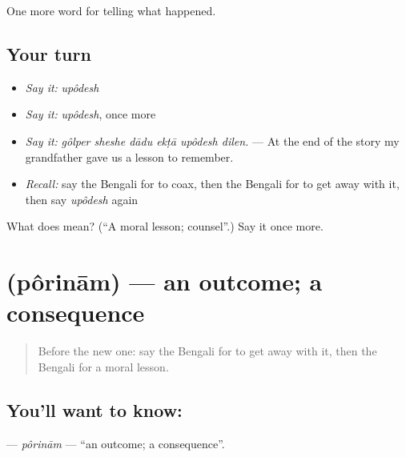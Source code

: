 \begin{grammarlens}[title={What you've built}]
One more word for telling what happened.
\end{grammarlens}

\subsection*{Your turn}
\begin{itemize}
\raggedright
  \item \emph{Say it:} \emph{upôdesh}
  \item \emph{Say it:} \emph{upôdesh}, once more
  \item \emph{Say it:} \emph{gôlper sheshe dādu ekṭā upôdesh dilen.} — At the end of the story my grandfather gave us a lesson to remember.
  \item \emph{Recall:} say the Bengali for to coax, then the Bengali for to get away with it, then say \emph{upôdesh} again
\end{itemize}

\begin{tcolorbox}[breakable,colback=teal!4,colframe=teal!35!black,title={Before you move on}]
What does  mean? (\textquotedblleft{}A moral lesson; counsel\textquotedblright{}.) Say it once more.
\end{tcolorbox}
\section[\texorpdfstring{\bn{পরিণাম} (pôrinām)}{পরিণাম (pôrinām)}]{ (pôrinām) — an outcome; a consequence}

\label{lesson:BN-C325-porinam}



\begin{quote}
Before the new one: say the Bengali for to get away with it, then the Bengali for a moral lesson.
\end{quote}

\subsection*{You'll want to know: }
\textbf{} — \emph{pôrinām} — \textquotedblleft{}an outcome; a consequence\textquotedblright{}.

\begin{quote}
    
\end{quote}

